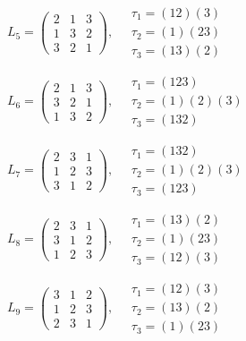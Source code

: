 $L_{5} = \begin{pmatrix} 2 & 1 & 3 \\ 1 & 3 & 2 \\ 3 & 2 & 1 \end{pmatrix}, \quad \begin{matrix} \tau_{1} = (1 2)(3) \\ \tau_{2} = (1)(2 3) \\ \tau_{3} = (1 3)(2) \end{matrix}$

$L_{6} = \begin{pmatrix} 2 & 1 & 3 \\ 3 & 2 & 1 \\ 1 & 3 & 2 \end{pmatrix}, \quad \begin{matrix} \tau_{1} = (1 2 3) \\ \tau_{2} = (1)(2)(3) \\ \tau_{3} = (1 3 2) \end{matrix}$

$L_{7} = \begin{pmatrix} 2 & 3 & 1 \\ 1 & 2 & 3 \\ 3 & 1 & 2 \end{pmatrix}, \quad \begin{matrix} \tau_{1} = (1 3 2) \\ \tau_{2} = (1)(2)(3) \\ \tau_{3} = (1 2 3) \end{matrix}$

$L_{8} = \begin{pmatrix} 2 & 3 & 1 \\ 3 & 1 & 2 \\ 1 & 2 & 3 \end{pmatrix}, \quad \begin{matrix} \tau_{1} = (1 3)(2) \\ \tau_{2} = (1)(2 3) \\ \tau_{3} = (1 2)(3) \end{matrix}$

$L_{9} = \begin{pmatrix} 3 & 1 & 2 \\ 1 & 2 & 3 \\ 2 & 3 & 1 \end{pmatrix}, \quad \begin{matrix} \tau_{1} = (1 2)(3) \\ \tau_{2} = (1 3)(2) \\ \tau_{3} = (1)(2 3) \end{matrix}$

